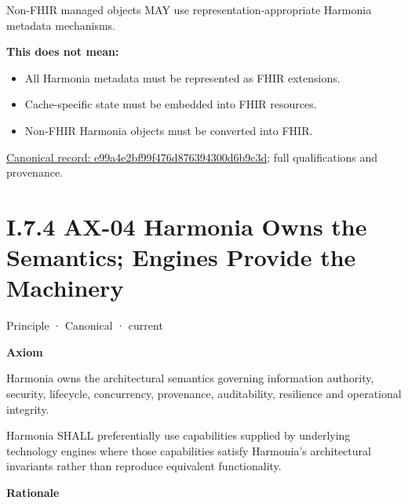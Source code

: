Non-FHIR managed objects MAY use representation-appropriate Harmonia
metadata mechanisms.



\textbf{This does not mean:}



\begin{itemize}


\item All Harmonia metadata must be represented as FHIR extensions.

\item Cache-specific state must be embedded into FHIR resources.

\item Non-FHIR Harmonia objects must be converted into FHIR.

\end{itemize}

{\footnotesize \href{../../../../../../../continuum/motivation/principle/e99a4e2bf99f476d876394300d6b9c3d.md}{Canonical record: e99a4e2bf99f476d876394300d6b9c3d}; full qualifications and provenance.}\par
\section*{I.7.4 AX-04 Harmonia Owns the Semantics; Engines Provide the Machinery}
\label{navigation:I.7.4}

\label{element:54508cda80484a6caf95b901780eaf7d}
{\small Principle · Canonical · current}\par

\par\medskip\textbf{Axiom}\par


Harmonia owns the architectural semantics governing information
authority, security, lifecycle, concurrency, provenance, auditability,
resilience and operational integrity.



Harmonia SHALL preferentially use capabilities supplied by underlying
technology engines where those capabilities satisfy Harmonia's
architectural invariants rather than reproduce equivalent functionality.



\par\medskip\textbf{Rationale}\par


